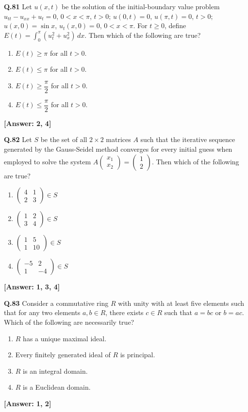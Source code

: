 \documentclass[12pt,a4paper]{article}
\newcommand{\ans}[1]{\quad\textcolor{anscolor}{\textbf{[Answer: #1]}}}
\begin{document}
\textbf{Q.81} Let $u(x,t)$ be the solution of the initial-boundary value problem $u_{tt}-u_{xx}+u_t=0$, $0<x<\pi$, $t>0$; $u(0,t)=0$, $u(\pi,t)=0$, $t>0$; $u(x,0)=\sin x$, $u_t(x,0)=0$, $0<x<\pi$. For $t\ge0$, define $E(t)=\int_0^\pi(u_t^2+u_x^2)\,dx$. Then which of the following are true?
\begin{enumerate}[label=\arabic*.]
\item $E(t)\ge\pi$ for all $t>0$. \item $E(t)\le\pi$ for all $t>0$.
\item $E(t)\ge\dfrac{\pi}{2}$ for all $t>0$. \item $E(t)\le\dfrac{\pi}{2}$ for all $t>0$.
\end{enumerate}\ans{2, 4}

\textbf{Q.82} Let $S$ be the set of all $2\times2$ matrices $A$ such that the iterative sequence generated by the Gauss-Seidel method converges for every initial guess when employed to solve the system $A\begin{pmatrix}x_1\\x_2\end{pmatrix}=\begin{pmatrix}1\\2\end{pmatrix}$. Then which of the following are true?
\begin{enumerate}[label=\arabic*.]
\item $\begin{pmatrix}4&1\\2&3\end{pmatrix}\in S$
\item $\begin{pmatrix}1&2\\3&4\end{pmatrix}\in S$
\item $\begin{pmatrix}1&5\\1&10\end{pmatrix}\in S$
\item $\begin{pmatrix}-5&2\\1&-4\end{pmatrix}\in S$
\end{enumerate}\ans{1, 3, 4}

\textbf{Q.83} Consider a commutative ring $R$ with unity with at least five elements such that for any two elements $a,b\in R$, there exists $c\in R$ such that $a=bc$ or $b=ac$. Which of the following are necessarily true?
\begin{enumerate}[label=\arabic*.]
\item $R$ has a unique maximal ideal. \item Every finitely generated ideal of $R$ is principal.
\item $R$ is an integral domain. \item $R$ is a Euclidean domain.
\end{enumerate}\ans{1, 2}
\end{document}
